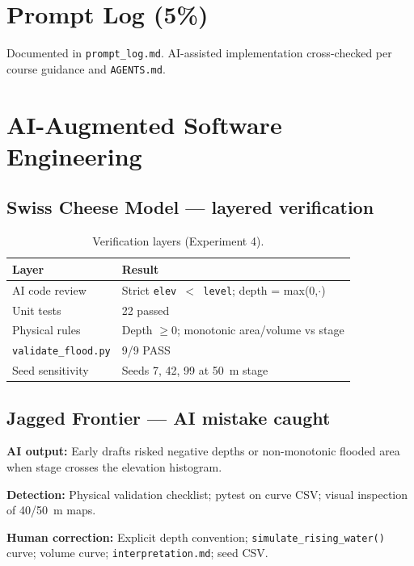 \documentclass[11pt,a4paper]{article}
\begin{document}
\section{Prompt Log (5\%)}

Documented in \texttt{prompt\_log.md}. AI-assisted implementation cross-checked per course guidance and \texttt{AGENTS.md}.

\section{AI-Augmented Software Engineering}
\label{sec:ai-eng}

\subsection{Swiss Cheese Model --- layered verification}
\begin{table}[htbp]
  \centering
  \caption{Verification layers (Experiment 4).}
  \label{tab:swiss4}
  \begin{tabular}{@{}ll@{}}
    \toprule
    Layer & Result \\
    \midrule
    AI code review & Strict \texttt{elev $<$ level}; depth = max(0,$\cdot$) \\
    Unit tests & 22 passed \\
    Physical rules & Depth $\ge 0$; monotonic area/volume vs stage \\
    \texttt{validate\_flood.py} & 9/9 PASS \\
    Seed sensitivity & Seeds 7, 42, 99 at 50~m stage \\
    \bottomrule
  \end{tabular}
\end{table}

\subsection{Jagged Frontier --- AI mistake caught}
\textbf{AI output:} Early drafts risked negative depths or non-monotonic flooded area when stage crosses the elevation histogram.

\textbf{Detection:} Physical validation checklist; pytest on curve CSV; visual inspection of 40/50~m maps.

\textbf{Human correction:} Explicit depth convention; \texttt{simulate\_rising\_water()} curve; volume curve; \texttt{interpretation.md}; seed CSV.
\end{document}
